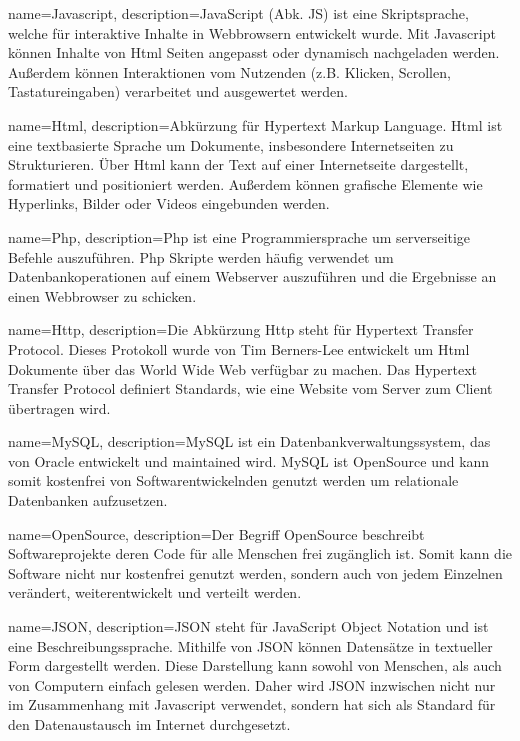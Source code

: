 {
    name=Javascript,
    description={JavaScript (Abk. JS) ist eine Skriptsprache, welche für interaktive Inhalte in Webbrowsern entwickelt wurde. Mit Javascript können Inhalte von \gls{Html} Seiten angepasst oder dynamisch nachgeladen werden. Außerdem können Interaktionen vom Nutzenden (z.B. Klicken, Scrollen, Tastatureingaben) verarbeitet und ausgewertet werden.\cite{Javascript}}
}

{
    name=Html,
    description={Abkürzung für Hypertext Markup Language. Html ist eine textbasierte Sprache um Dokumente, insbesondere Internetseiten zu Strukturieren. Über Html kann der Text auf einer Internetseite dargestellt, formatiert und positioniert werden. Außerdem können grafische Elemente wie Hyperlinks, Bilder oder Videos eingebunden werden.\cite{Html}}
}

{
    name=Php,
    description={Php ist eine Programmiersprache um serverseitige Befehle auszuführen. Php Skripte werden häufig verwendet um Datenbankoperationen auf einem Webserver auszuführen und die Ergebnisse an einen Webbrowser zu schicken.\cite{Php}}
}

{
    name=Http,
    description={Die Abkürzung Http steht für Hypertext Transfer Protocol. Dieses Protokoll wurde von Tim Berners-Lee entwickelt um \gls{Html} Dokumente über das World Wide Web verfügbar zu machen. Das Hypertext Transfer Protocol definiert Standards, wie eine Website vom Server zum Client übertragen wird.}
}

{
    name=MySQL,
    description={MySQL ist ein Datenbankverwaltungssystem, das von Oracle entwickelt und maintained wird. MySQL ist OpenSource und kann somit kostenfrei von Softwarentwickelnden genutzt werden um relationale Datenbanken aufzusetzen.}
}

{
    name=OpenSource,
    description={Der Begriff OpenSource beschreibt Softwareprojekte deren Code für alle Menschen frei zugänglich ist. Somit kann die Software nicht nur kostenfrei genutzt werden, sondern auch von jedem Einzelnen verändert, weiterentwickelt und verteilt werden.}
}

{
    name=JSON,
    description={JSON steht für JavaScript Object Notation und ist eine Beschreibungssprache. Mithilfe von JSON können Datensätze in textueller Form dargestellt werden. Diese Darstellung kann sowohl von Menschen, als auch von Computern einfach gelesen werden. Daher wird JSON inzwischen nicht nur im Zusammenhang mit \gls{Javascript} verwendet, sondern hat sich als Standard für den Datenaustausch im Internet durchgesetzt.}
}

